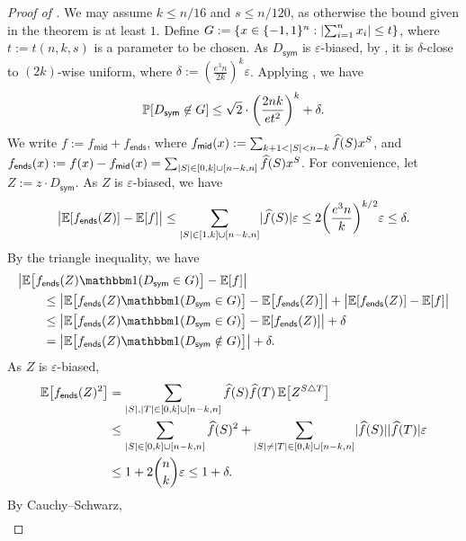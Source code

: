 \documentclass[10pt,a4paper]{article}
\theoremstyle{definition}
\renewcommand{\Pr}{\mathop{\mathbb{P}\/}}
\newcommand{\E}{\mathop{\mathbb{E}\/}}
\newcommand{\bbone}{\mathbbm 1}
\newcommand{\Id}{\bbone}
\newcommand{\eps}{\epsilon}
\newcommand{\wh}[1]{\widehat{#1}}
\newcommand{\pmo}{\{-1,1\}}
\newcommand{\hf}{\wh{f}}
\DeclarePairedDelimiter\abs{\lvert}{\rvert}
\def\sym{\mathsf{sym}}
\def\ends{\mathsf{ends}}
\def\middle{\mathsf{mid}}
\def\symdiff{\bigtriangleup}
\def\epsilon{\varepsilon}
\begin{document}
\begin{proof}[Proof of ]
  We may assume $k \le n/16$ and $s \le n/120$, as otherwise the bound given in the theorem is at least $1$.
  Define $G := \{ x \in \pmo^n: \abs{\sum_{i=1}^n x_i} \le t \}$, where $t := t(n,k,s)$ is a parameter to be chosen.
  As $D_\sym$ is $\eps$-biased, by , it is $\delta$-close to $(2k)$-wise uniform, where $\delta := (\frac{e^3n}{2k})^k \eps$.
  Applying , we have
  \begin{align} \label{eq:shifted-sym-bias-tail}
    \Pr[ D_\sym \not\in G ]
    \le \sqrt{2} \cdot \left( \frac{2nk}{et^2} \right)^k + \delta .
  \end{align}
  We write $f := f_{\middle} + f_{\ends}$, where $f_{\middle}(x) := \sum_{k+1 < \abs{S} < n-k} \hf(S) x^S$, and $f_\ends(x) := f(x) - f_{\middle}(x) = \sum_{\abs{S} \in [0,k] \cup [n-k,n]} \hf(S) x^S$.
  For convenience, let $Z:= z \cdot D_{\sym}$.
  As $Z$ is $\eps$-biased, we have
  \[
    \abs[\big]{ \E[f_{\ends}(Z)] - \E[f] }
    \le \sum_{\abs{S} \in [1,k] \cup [n-k,n]} \abs{\hf(S)} \eps
    \le 2 \biggl(\frac{e^3n}{k}\biggr)^{k/2} \eps
    \le \delta .
  \]
  By the triangle inequality, we have
  \begin{align}
    \MoveEqLeft
    \abs[\big]{ \E\bigl[f_{\ends}(Z) \Id(D_\sym \in G)\bigr] - \E[f]  }  \nonumber \\
    &\le \abs[\big]{ \E\bigl[f_{\ends}(Z) \Id(D_\sym \in G)\bigr] - \E\bigl[f_{\ends}(Z)\bigr]  } + \abs[\big]{ \E[f_{\ends}(Z)] - \E[f] } \nonumber \\
    &\le \abs[\big]{ \E\bigl[f_{\ends}(Z) \Id(D_\sym \in G)\bigr] - \E[f_{\ends}(Z)]  } + \delta \nonumber \\
    &= \abs[\big]{ \E\bigl[f_{\ends}(Z) \Id(D_\sym \notin G)\bigr] } + \delta . \label{eq:shifted-sym-bias-1}
  \end{align}
  As $Z$ is $\eps$-biased,
  \begin{align*}
    \E\bigl[f_{\ends}(Z)^2\bigr]
    &= \sum_{\abs{S},\abs{T} \in [0,k] \cup [n-k,n]} \hf(S) \hf(T) \E\bigl[Z^{S \symdiff T}\bigr] \\
    &\le \sum_{\abs{S} \in [0,k] \cup [n-k,n]} \hf(S)^2 + \sum_{\abs{S} \ne \abs{T} \in [0,k] \cup [n-k,n]} \abs{\hf(S)} \abs{\hf(T)} \eps  \\
    &\le 1 + 2\binom{n}{k} \eps \le 1 + \delta .
  \end{align*}
  By Cauchy--Schwarz,
  \begin{align} \label{eq:shifted-sym-bias-2}

\end{align}
\end{proof}
\end{document}
